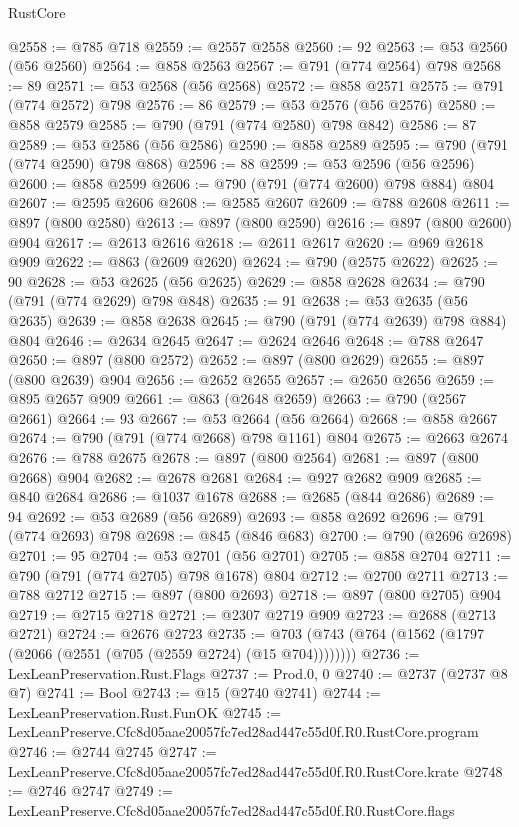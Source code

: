 \begin{lexlean}{RustCore}
\begin{coremodule}
@2558 := @785 @718
@2559 := @2557 @2558
@2560 := 92
@2563 := @53 @2560 (@56 @2560)
@2564 := @858 @2563
@2567 := @791 (@774 @2564) @798
@2568 := 89
@2571 := @53 @2568 (@56 @2568)
@2572 := @858 @2571
@2575 := @791 (@774 @2572) @798
@2576 := 86
@2579 := @53 @2576 (@56 @2576)
@2580 := @858 @2579
@2585 := @790 (@791 (@774 @2580) @798 @842)
@2586 := 87
@2589 := @53 @2586 (@56 @2586)
@2590 := @858 @2589
@2595 := @790 (@791 (@774 @2590) @798 @868)
@2596 := 88
@2599 := @53 @2596 (@56 @2596)
@2600 := @858 @2599
@2606 := @790 (@791 (@774 @2600) @798 @884) @804
@2607 := @2595 @2606
@2608 := @2585 @2607
@2609 := @788 @2608
@2611 := @897 (@800 @2580)
@2613 := @897 (@800 @2590)
@2616 := @897 (@800 @2600) @904
@2617 := @2613 @2616
@2618 := @2611 @2617
@2620 := @969 @2618 @909
@2622 := @863 (@2609 @2620)
@2624 := @790 (@2575 @2622)
@2625 := 90
@2628 := @53 @2625 (@56 @2625)
@2629 := @858 @2628
@2634 := @790 (@791 (@774 @2629) @798 @848)
@2635 := 91
@2638 := @53 @2635 (@56 @2635)
@2639 := @858 @2638
@2645 := @790 (@791 (@774 @2639) @798 @884) @804
@2646 := @2634 @2645
@2647 := @2624 @2646
@2648 := @788 @2647
@2650 := @897 (@800 @2572)
@2652 := @897 (@800 @2629)
@2655 := @897 (@800 @2639) @904
@2656 := @2652 @2655
@2657 := @2650 @2656
@2659 := @895 @2657 @909
@2661 := @863 (@2648 @2659)
@2663 := @790 (@2567 @2661)
@2664 := 93
@2667 := @53 @2664 (@56 @2664)
@2668 := @858 @2667
@2674 := @790 (@791 (@774 @2668) @798 @1161) @804
@2675 := @2663 @2674
@2676 := @788 @2675
@2678 := @897 (@800 @2564)
@2681 := @897 (@800 @2668) @904
@2682 := @2678 @2681
@2684 := @927 @2682 @909
@2685 := @840 @2684
@2686 := @1037 @1678
@2688 := @2685 (@844 @2686)
@2689 := 94
@2692 := @53 @2689 (@56 @2689)
@2693 := @858 @2692
@2696 := @791 (@774 @2693) @798
@2698 := @845 (@846 @683)
@2700 := @790 (@2696 @2698)
@2701 := 95
@2704 := @53 @2701 (@56 @2701)
@2705 := @858 @2704
@2711 := @790 (@791 (@774 @2705) @798 @1678) @804
@2712 := @2700 @2711
@2713 := @788 @2712
@2715 := @897 (@800 @2693)
@2718 := @897 (@800 @2705) @904
@2719 := @2715 @2718
@2721 := @2307 @2719 @909
@2723 := @2688 (@2713 @2721)
@2724 := @2676 @2723
@2735 := @703 (@743 (@764 (@1562 (@1797 (@2066 (@2551 (@705 (@2559 @2724) (@15 @704))))))))
@2736 := LexLeanPreservation.Rust.Flags
@2737 := Prod.{0, 0}
@2740 := @2737 (@2737 @8 @7)
@2741 := Bool
@2743 := @15 (@2740 @2741)
@2744 := LexLeanPreservation.Rust.FunOK
@2745 := LexLeanPreserve.Cfc8d05aae20057fc7ed28ad447c55d0f.R0.RustCore.program
@2746 := @2744 @2745
@2747 := LexLeanPreserve.Cfc8d05aae20057fc7ed28ad447c55d0f.R0.RustCore.krate
@2748 := @2746 @2747
@2749 := LexLeanPreserve.Cfc8d05aae20057fc7ed28ad447c55d0f.R0.RustCore.flags

\end{coremodule}
\end{lexlean}
